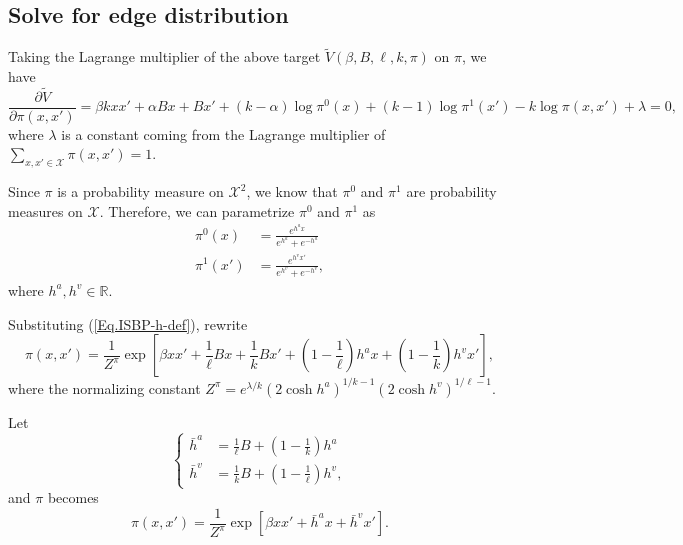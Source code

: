 \documentclass[12pt]{article}
\numberwithin{equation}{section}
\begin{document}
\subsection{Solve for edge distribution}

Taking the Lagrange multiplier of the above target $\widetilde{V}(\beta, B, \ell, k, \pi)$ on $\pi$, we have
\begin{equation*}
    \frac{\partial \widetilde{V}}{\partial \pi(x, x')} = \beta k x x' + \alpha B x + B x' + (k-\alpha) \log \pi^0(x) + (k-1)\log\pi^1(x') - k\log\pi(x, x') + \lambda = 0,
\end{equation*}
where $\lambda$ is a constant coming from the Lagrange multiplier of $\sum_{x, x'\in\mathcal{X}} \pi(x, x') = 1$.

Since $\pi$ is a probability measure on $\mathcal{X}^2$, we know that $\pi^0$ and $\pi^1$ are probability measures on $\mathcal{X}$.
Therefore, we can parametrize $\pi^0$ and $\pi^1$ as
\begin{equation}
    \begin{aligned}
        \pi^0(x)  & = \frac{e^{h^a x}}{e^{h^a} + e^{-h^a}}   \\
        \pi^1(x') & = \frac{e^{h^v x'}}{e^{h^v} + e^{-h^v}},
    \end{aligned}
    \label{Eq.ISBP-h-def}
\end{equation}
where $h^a, h^v\in\mathbb{R}$.

Substituting (\ref{Eq.ISBP-h-def}), rewrite
\begin{equation}
    \pi(x, x') = \frac1{Z^\pi} \exp\left[\beta xx' + \frac1\ell Bx + \frac1kBx' + \left(1-\frac1\ell\right)h^ax + \left(1-\frac1k\right)h^vx'\right],
\end{equation}
where the normalizing constant $Z^\pi=e^{\lambda/k}(2\cosh h^a)^{1/k-1}(2\cosh h^v)^{1/\ell-1}$.

Let
\begin{equation}
    \begin{cases}
        \bar{h}^a & = \frac1\ell B + \left(1 - \frac1k\right)h^a  \\
        \bar{h}^v & = \frac1k B + \left(1 - \frac1\ell\right)h^v,
    \end{cases}
    \label{Eq.ISBP-hbar-def}
\end{equation}
and $\pi$ becomes
\begin{equation}
    \pi(x, x') = \frac1{Z^\pi} \exp\left[\beta xx' + \bar{h}^a x + \bar{h}^v x'\right].
    \label{Eq.ISBP-pi-hbar}
\end{equation}
\end{document}

